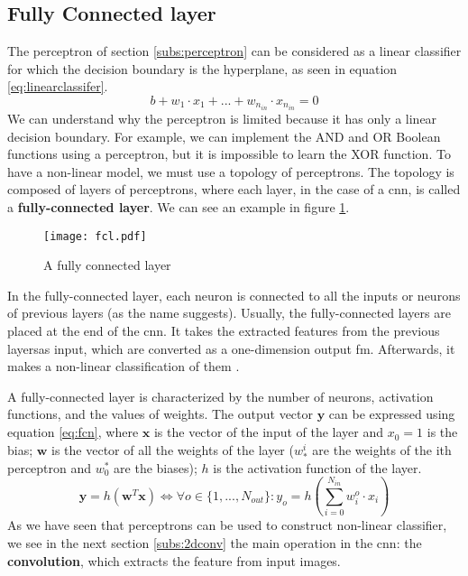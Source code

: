 \subsection{Fully Connected layer} \label{subs:fcl}
The perceptron of section \ref{subs:perceptron} can be considered as a linear classifier for which the decision boundary is the hyperplane, as seen in equation \eqref{eq:linearclassifer}.
%
\begin{equation}
    b + w_1 \cdot x_1 + ... + w_{n_{in}} \cdot x_{n_{in}} = 0
    \label{eq:linearclassifer}
\end{equation}
%
We can understand why the perceptron is limited because it has only a linear decision boundary. For example, we can implement the AND and OR Boolean functions using a perceptron, but it is impossible to learn the XOR function. To have a non-linear model, we must use a topology of perceptrons. The topology is composed of layers of perceptrons, where each layer, in the case of a \acrshort{cnn}, is called a \textbf{fully-connected layer}. We can see an example in figure \ref{fig:fcn}.
%
\begin{figure}
    \centering
    \texttt{[image: fcl.pdf]}
    \caption{A fully connected layer}
    \label{fig:fcn}
\end{figure}

In the fully-connected layer, each neuron is connected to all the inputs or neurons of previous layers (as the name suggests). Usually, the fully-connected layers are placed at the end of the \acrshort{cnn}. It takes the extracted features from the previous layersas input, which are converted as a one-dimension output \acrshort{fm}. Afterwards, it makes a non-linear classification of them \cite{khan_survey_2020}.

A fully-connected layer is characterized by the number of neurons, activation functions, and the values of weights. The output vector $\boldsymbol{y}$ can be expressed using equation \eqref{eq:fcn}, where $\boldsymbol{x}$ is the vector of the input of the layer and $x_0 = 1$ is the bias;   $\boldsymbol{w}$ is the vector of all the weights of the layer ($w^i_*$ are the weights of the ith perceptron and $w^*_0$ are the biases); $h$ is the activation function of the layer.
%
\begin{equation}
    \boldsymbol{y} = h(\boldsymbol{w}^T \boldsymbol{x}) \Leftrightarrow \forall o \in \{ 1, ..., N_{out} \} : y_o = h(\sum^{N_{in}}_{i=0} w^o_i \cdot x_i)
    \label{eq:fcn}
\end{equation}
%
As we have seen that perceptrons can be used to construct non-linear classifier, we see in the next section \ref{subs:2dconv} the main operation in the \acrshort{cnn}: the \textbf{convolution}, which extracts the feature from input images.
